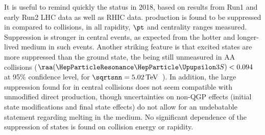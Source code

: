 \documentclass[../report.tex]{subfiles}
\begin{document}
It is useful to remind quickly the status in 2018, based on results from Run1 and early Run2 LHC data as well as RHIC data. \PGU production is found to be suppressed in \PbPb compared to \pp
collisions, in all rapidity, $\pt$ and centrality ranges measured. Suppression is stronger in central events, as expected from the hotter and longer-lived medium in such events.
Another striking feature is that excited states are more suppressed than the ground state, the  being still unmeasured in AA collisions ($\raa(\PGUP{3S})<0.094$ at 95\% confidence
level, for $\sqrtsnn = \unit[5.02]{TeV}$~\cite{Sirunyan:2018nsz}). In addition, the large suppression found for  in central collisions does not seem compatible with unmodified direct  production,
though uncertainties on non-QGP effects (initial state modifications and final state effects) do not allow for an undebatable statement regarding  melting in the medium.
No significant dependence of the suppression of \PGU states is found on collision energy or rapidity.
\end{document}
